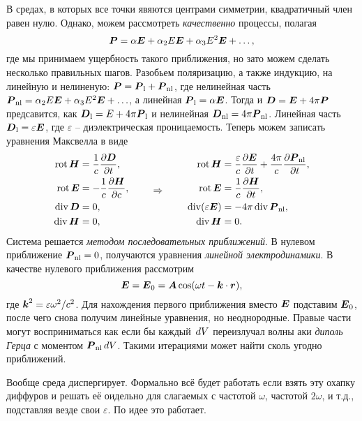 В средах, в которых все точки явяются центрами симметрии, квадратичный член равен нулю. Однако, можем рассмотреть \textit{качественно} процессы, полагая
\begin{equation*}
    \mbox{\boldmath $P$} = \alpha \mbox{\boldmath $E$} + \alpha_2 E \mbox{\boldmath $E$} + \alpha_3 E^2 \mbox{\boldmath $E$} + \ldots,
\end{equation*}
где мы принимаем ущербность такого приближения, но зато можем сделать несколько правильных шагов. Разобьем поляризацию, а также индукцию, на линейную и нелиненую: $\mbox{\boldmath $P$} = \mbox{\boldmath $P$}_{\textnormal{l}}+\mbox{\boldmath $P$}_{\textnormal{nl}}$, где нелинейная часть $\mbox{\boldmath $P$}_{\textnormal{nl}} = \alpha_2 E \mbox{\boldmath $E$} + \alpha_3 E^2 \mbox{\boldmath $E$} + \ldots$, а линейная $\mbox{\boldmath $P$}_{\textnormal{l}} = \alpha \mbox{\boldmath $E$}$. Тогда и $\mbox{\boldmath $D$} = \mbox{\boldmath $E$} + 4 \pi \mbox{\boldmath $P$}$ предсавится, как $\mbox{\boldmath $D$}_{\textnormal{l}}=E+4 \pi \mbox{\boldmath $P$}_{\textnormal{l}}$ и нелинейная $\mbox{\boldmath $D$}_{\textnormal{nl}}=4 \pi \mbox{\boldmath $P$}_{\textnormal{nl}}$. Линейная часть $\mbox{\boldmath $D$}_{\textnormal{l}}=\varepsilon \mbox{\boldmath $E$}$, где $\varepsilon$ -- диэлектрическая проницаемость. Теперь можем записать уравнения Максвелла в виде
\begin{equation*}
\left.\begin{aligned}
    \mathop{\mathrm{rot}}\nolimits \mbox{\boldmath $H$} &= \frac{1}{c} \frac{\partial \mbox{\boldmath $D$}}{\partial t}, \\
    \mathop{\mathrm{rot}}\nolimits \mbox{\boldmath $E$} &= - \frac{1}{c} \frac{\partial \mbox{\boldmath $H$}}{\partial c}, \\
    \mathop{\mathrm{div}}\nolimits \mbox{\boldmath $D$} &= 0, \\
    \mathop{\mathrm{div}}\nolimits \mbox{\boldmath $H$} &= 0, \\
\end{aligned}\right.
\hspace{0.75cm} \Rightarrow \hspace{0.75cm}
\left.\begin{aligned}
            \mathop{\mathrm{rot}}\nolimits \mbox{\boldmath $H$}  &=  \frac{\varepsilon}{c} \frac{\partial \mbox{\boldmath $E$}}{\partial t} + \frac{4 \pi}{c} \frac{\partial \mbox{\boldmath $P$}_{\textnormal{nl}}}{\partial t} , \\
    \mathop{\mathrm{rot}}\nolimits \mbox{\boldmath $E$}  &=  \frac{1}{c} \frac{\partial \mbox{\boldmath $H$}}{\partial t}, \\
    \mathop{\mathrm{div}}\nolimits(\varepsilon \mbox{\boldmath $E$}) &= - 4\pi \mathop{\mathrm{div}}\nolimits \mbox{\boldmath $P$}_{\textnormal{nl}}, \\
    \mathop{\mathrm{div}}\nolimits \mbox{\boldmath $H$} &= 0.
    \end{aligned}\right.    
\end{equation*}
Система решается \textit{методом последовательных приближений}. В нулевом приближение $\mbox{\boldmath $P$}_{\textnormal{nl}}=0$, получаются уравнения \textit{линейной электродинамики}. В качестве нулевого приближения рассмотрим
\begin{equation*}
    \mbox{\boldmath $E$} = \mbox{\boldmath $E$}_0 = \mbox{\boldmath $A$} \cos(\omega t - \mbox{\boldmath $k$} \cdot \mbox{\boldmath $r$}),
\end{equation*}
где $\mbox{\boldmath $k$}^2 = \varepsilon \omega^2/c^2$. Для нахождения первого приближения вместо $\mbox{\boldmath $E$}$ подставим $\mbox{\boldmath $E$}_0$, после чего снова получим линейные уравнения, но неоднородные. Правые части могут восприниматься как если бы каждый $\, d V$ переизлучал волны аки \textit{диполь Герца} с моментом $\mbox{\boldmath $P$}_{\textnormal{nl}} \, d V$. Такими итерациями может найти сколь угодно приближений. 


Вообще среда диспергирует. Формально всё будет работать если взять эту охапку диффуров и решать её оидельно для слагаемых с частотой $\omega$, частотой $2\omega$, и т.д., подставляя везде свои $\varepsilon$. По идее это работает. 